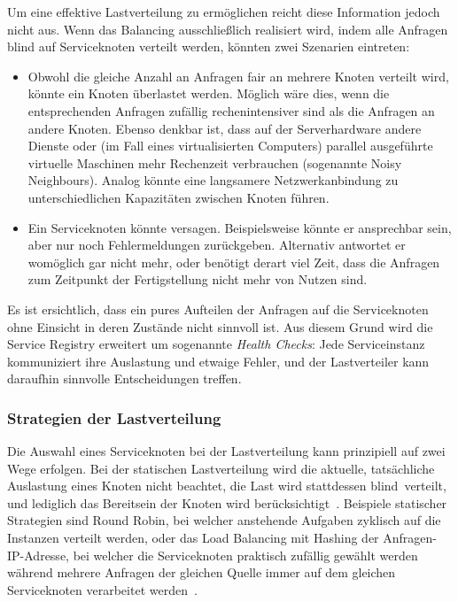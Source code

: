 Um eine effektive Lastverteilung zu ermöglichen reicht diese Information jedoch nicht aus. Wenn das Balancing ausschließlich realisiert wird, indem alle Anfragen \glq blind\grq{} auf Serviceknoten verteilt werden, könnten zwei Szenarien eintreten:
\begin{itemize}
	\item Obwohl die gleiche Anzahl an Anfragen fair an mehrere Knoten verteilt wird, könnte ein Knoten überlastet werden. Möglich wäre dies, wenn die entsprechenden Anfragen zufällig rechenintensiver sind als die Anfragen an andere Knoten. Ebenso denkbar ist, dass auf der Serverhardware andere Dienste oder (im Fall eines virtualisierten Computers) parallel ausgeführte virtuelle Maschinen mehr Rechenzeit verbrauchen (sogenannte \glqq Noisy Neighbours\grqq{}). Analog könnte eine langsamere Netzwerkanbindung zu unterschiedlichen Kapazitäten zwischen Knoten führen.
	\item Ein Serviceknoten könnte versagen. Beispielsweise könnte er ansprechbar sein, aber nur noch Fehlermeldungen zurückgeben. Alternativ antwortet er womöglich gar nicht mehr, oder benötigt derart viel Zeit, dass die Anfragen zum Zeitpunkt der Fertigstellung nicht mehr von Nutzen sind.
\end{itemize}

Es ist ersichtlich, dass ein pures Aufteilen der Anfragen auf die Serviceknoten ohne Einsicht in deren Zustände nicht sinnvoll ist. Aus diesem Grund wird die Service Registry erweitert um sogenannte \textit{Health Checks}: Jede Serviceinstanz kommuniziert ihre Auslastung und etwaige Fehler, und der Lastverteiler kann daraufhin sinnvolle Entscheidungen treffen.

\subsubsection{Strategien der Lastverteilung}\label{sec:loadbalancing-strats}
Die Auswahl eines Serviceknoten bei der Lastverteilung kann prinzipiell auf zwei Wege erfolgen. Bei der statischen Lastverteilung wird die aktuelle, tatsächliche Auslastung eines Knoten nicht beachtet, die Last wird stattdessen \glq blind\grq\ verteilt, und lediglich das Bereitsein der Knoten wird berücksichtigt~\cite{mishra.2020}. Beispiele statischer Strategien sind Round Robin, bei welcher anstehende Aufgaben zyklisch auf die Instanzen verteilt werden, oder das Load Balancing mit Hashing der Anfragen-IP-Adresse, bei welcher die Serviceknoten praktisch zufällig gewählt werden während mehrere Anfragen der gleichen Quelle immer auf dem gleichen Serviceknoten verarbeitet werden~\cite{g4g-loadbalancing}.

